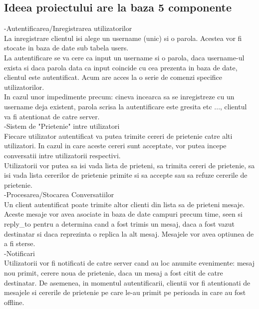 \documentclass[runningheads]{llncs}
\begin{document}
\subsection{Ideea proiectului are la baza 5 componente}
-Autentificarea/Inregistrarea utilizatorilor\\
La inregistrare clientul isi alege un username (unic) si o parola. Acestea vor fi stocate in baza de date sub tabela users. \\
La autentificare se va cere ca input un username si o parola, daca username-ul exista si daca parola data ca input coincide cu cea prezenta in baza de date, clientul este autentificat. Acum are acces la o serie de comenzi specifice utilizatorilor. \\
In cazul unor impedimente precum: cineva incearca sa se inregistreze cu un username deja existent, parola scrisa la autentificare este gresita etc ..., clientul va fi atentionat de catre server.\\
-Sistem de "Prietenie" intre utilizatori\\
Fiecare utilizator autentificat va putea trimite cereri de prietenie catre alti utilizatori. In cazul in care aceste cereri sunt acceptate, vor putea incepe conversatii intre utilizatorii respectivi. \\
Utilizatorii vor putea sa isi vada lista de prieteni, sa trimita cereri de prietenie, sa isi vada lista cererilor de prietenie primite si sa accepte sau sa refuze cererile de prietenie.\\
-Procesarea/Stocarea Conversatiilor\\
Un client autentificat poate trimite altor clienti din lista sa de prieteni mesaje. Aceste mesaje vor avea asociate in baza de date campuri precum time, seen si reply\_to pentru a determina cand a fost trimis un mesaj, daca a fost vazut destinatar si daca reprezinta o replica la alt mesaj. Mesajele vor avea optiunea de a fi sterse.\\
-Notificari\\
Utilizatorii vor fi notificati de catre server cand au loc anumite evenimente: mesaj nou primit, cerere noua de prietenie, daca un mesaj a fost citit de catre destinatar. De asemenea, in momentul autentificarii, clientii vor fi atentionati de mesajele si cererile de prietenie pe care le-au primit pe perioada in care au fost offline.\\
\end{document}
